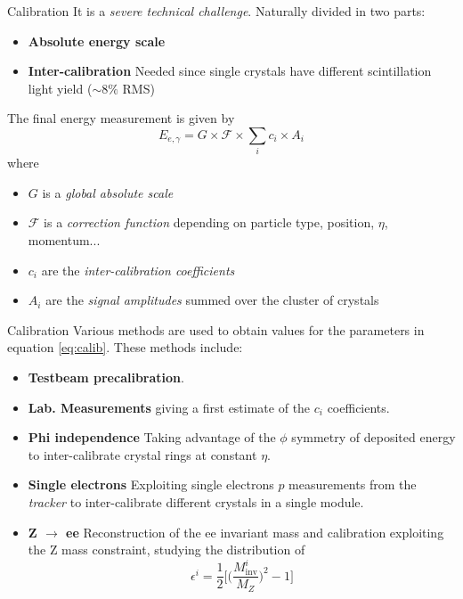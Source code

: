 \documentclass[10pt]{beamer}
\begin{document}
\begin{frame}{Calibration}
    It is a \emph{severe technical challenge}.
    Naturally divided in two parts:
    \begin{itemize}
        \item \textbf{Absolute energy scale}
        \item \textbf{Inter-calibration} Needed since single crystals have different scintillation light yield ($\sim 8\%$ RMS)
    \end{itemize}
    The final energy measurement is given by
    \begin{equation}
        E_{e,\gamma} = G \times \mathcal{F} \times \sum_i c_i \times A_i
    \label{eq:calib}
    \end{equation}
    where
    \begin{itemize}
        \item $G$ is a \emph{global absolute scale}
        \item $\mathcal{F}$ is a \emph{correction function} depending on particle type, position, $\eta$, momentum...
        \item $c_i$ are the \emph{inter-calibration coefficients}
        \item $A_i$ are the \emph{signal amplitudes} summed over the cluster of crystals 
    \end{itemize}{}
    
\end{frame}

\begin{frame}{Calibration}
    Various methods are used to obtain values for the parameters in equation \eqref{eq:calib}. These methods include:
    
    \begin{itemize}
        \item \textbf{Testbeam precalibration}.
        \item \textbf{Lab. Measurements} giving a first estimate of the $c_i$ coefficients.
        \item \textbf{Phi independence} Taking advantage of the $\phi$ symmetry of deposited energy to inter-calibrate crystal rings at constant $\eta$.
        \item \textbf{Single electrons} Exploiting single electrons $p$ measurements from the \emph{tracker} to inter-calibrate different crystals in a single module.
        \item \textbf{Z $\rightarrow$ ee} Reconstruction of the ee invariant mass and calibration exploiting the Z mass constraint, studying the distribution of 
        \begin{equation}
            \epsilon^i = \frac{1}{2} \biggl[\biggl(\frac{M^i_\text{inv}}{M_Z}\biggr)^2 - 1\biggr]
        \end{equation}
    \end{itemize}
    
\end{frame}
\end{document}
